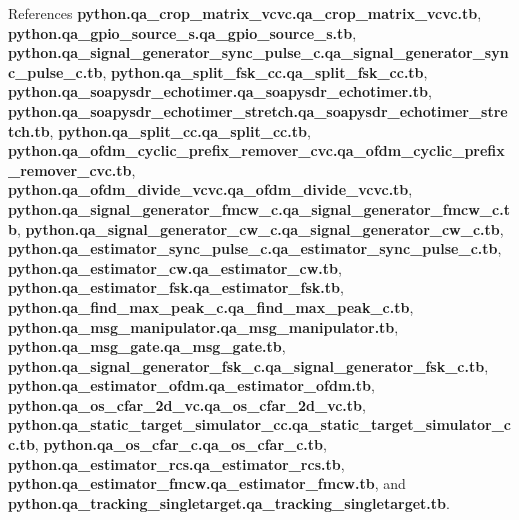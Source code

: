 References {\bf python.\+qa\+\_\+crop\+\_\+matrix\+\_\+vcvc.\+qa\+\_\+crop\+\_\+matrix\+\_\+vcvc.\+tb}, {\bf python.\+qa\+\_\+gpio\+\_\+source\+\_\+s.\+qa\+\_\+gpio\+\_\+source\+\_\+s.\+tb}, {\bf python.\+qa\+\_\+signal\+\_\+generator\+\_\+sync\+\_\+pulse\+\_\+c.\+qa\+\_\+signal\+\_\+generator\+\_\+sync\+\_\+pulse\+\_\+c.\+tb}, {\bf python.\+qa\+\_\+split\+\_\+fsk\+\_\+cc.\+qa\+\_\+split\+\_\+fsk\+\_\+cc.\+tb}, {\bf python.\+qa\+\_\+soapysdr\+\_\+echotimer.\+qa\+\_\+soapysdr\+\_\+echotimer.\+tb}, {\bf python.\+qa\+\_\+soapysdr\+\_\+echotimer\+\_\+stretch.\+qa\+\_\+soapysdr\+\_\+echotimer\+\_\+stretch.\+tb}, {\bf python.\+qa\+\_\+split\+\_\+cc.\+qa\+\_\+split\+\_\+cc.\+tb}, {\bf python.\+qa\+\_\+ofdm\+\_\+cyclic\+\_\+prefix\+\_\+remover\+\_\+cvc.\+qa\+\_\+ofdm\+\_\+cyclic\+\_\+prefix\+\_\+remover\+\_\+cvc.\+tb}, {\bf python.\+qa\+\_\+ofdm\+\_\+divide\+\_\+vcvc.\+qa\+\_\+ofdm\+\_\+divide\+\_\+vcvc.\+tb}, {\bf python.\+qa\+\_\+signal\+\_\+generator\+\_\+fmcw\+\_\+c.\+qa\+\_\+signal\+\_\+generator\+\_\+fmcw\+\_\+c.\+tb}, {\bf python.\+qa\+\_\+signal\+\_\+generator\+\_\+cw\+\_\+c.\+qa\+\_\+signal\+\_\+generator\+\_\+cw\+\_\+c.\+tb}, {\bf python.\+qa\+\_\+estimator\+\_\+sync\+\_\+pulse\+\_\+c.\+qa\+\_\+estimator\+\_\+sync\+\_\+pulse\+\_\+c.\+tb}, {\bf python.\+qa\+\_\+estimator\+\_\+cw.\+qa\+\_\+estimator\+\_\+cw.\+tb}, {\bf python.\+qa\+\_\+estimator\+\_\+fsk.\+qa\+\_\+estimator\+\_\+fsk.\+tb}, {\bf python.\+qa\+\_\+find\+\_\+max\+\_\+peak\+\_\+c.\+qa\+\_\+find\+\_\+max\+\_\+peak\+\_\+c.\+tb}, {\bf python.\+qa\+\_\+msg\+\_\+manipulator.\+qa\+\_\+msg\+\_\+manipulator.\+tb}, {\bf python.\+qa\+\_\+msg\+\_\+gate.\+qa\+\_\+msg\+\_\+gate.\+tb}, {\bf python.\+qa\+\_\+signal\+\_\+generator\+\_\+fsk\+\_\+c.\+qa\+\_\+signal\+\_\+generator\+\_\+fsk\+\_\+c.\+tb}, {\bf python.\+qa\+\_\+estimator\+\_\+ofdm.\+qa\+\_\+estimator\+\_\+ofdm.\+tb}, {\bf python.\+qa\+\_\+os\+\_\+cfar\+\_\+2d\+\_\+vc.\+qa\+\_\+os\+\_\+cfar\+\_\+2d\+\_\+vc.\+tb}, {\bf python.\+qa\+\_\+static\+\_\+target\+\_\+simulator\+\_\+cc.\+qa\+\_\+static\+\_\+target\+\_\+simulator\+\_\+cc.\+tb}, {\bf python.\+qa\+\_\+os\+\_\+cfar\+\_\+c.\+qa\+\_\+os\+\_\+cfar\+\_\+c.\+tb}, {\bf python.\+qa\+\_\+estimator\+\_\+rcs.\+qa\+\_\+estimator\+\_\+rcs.\+tb}, {\bf python.\+qa\+\_\+estimator\+\_\+fmcw.\+qa\+\_\+estimator\+\_\+fmcw.\+tb}, and {\bf python.\+qa\+\_\+tracking\+\_\+singletarget.\+qa\+\_\+tracking\+\_\+singletarget.\+tb}.

